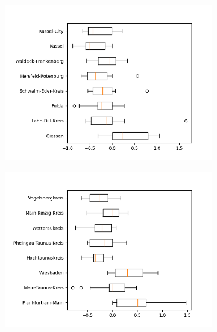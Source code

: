 \begin{figure}
	\centering
	\begin{subfigure}[b]{0.4\textwidth}
		\centering
		\includegraphics[width=\textwidth]{./figures/60d/deviation_box60_alt1.png}	
	\end{subfigure}
	\begin{subfigure}[b]{0.4\textwidth}
		\centering
		\includegraphics[width=\textwidth]{./figures/60d/deviation_box60_alt2.png}	
	\end{subfigure}
	\begin{subfigure}[b]{0.4\textwidth}
		\centering

\end{subfigure}
\end{figure}
